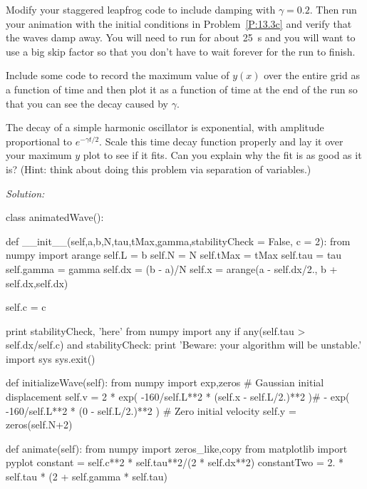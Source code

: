 \begin{enumerate}
\begin{enumerate}
\fi
    \subprob \label{P:14.1b} Modify your staggered leapfrog code to
    include damping with $\gamma=0.2$. Then run your animation with
    the initial conditions in Problem~\ref{P:13.3c} and verify that
    the waves damp away.  You will need to run for about 25~s and you
    will want to use a big skip factor so that you don't have to wait
    forever for the run to finish.  

    \subprob \label{P:14.1d}Include some code to record the maximum value of $y(x)$
    over the entire grid as a function of time and then plot it as a
    function of time at the end of the run so that you can see the
    decay caused by $\gamma$. 

    \subprob The decay of a simple harmonic oscillator is exponential,
    with amplitude proportional to $e^{-\gamma t/2}$. Scale this time
    decay function properly and lay it over your maximum $y$ plot to
    see if it fits. Can you explain why the fit is as good as it is?
    (Hint: think about doing this problem via separation of
    variables.)  


\end{enumerate}
\ifsolutions
\textit{Solution:}\\
\begin{codeexample}
\begin{VerbatimOut}{\listingFile}

class animatedWave():

    def __init__(self,a,b,N,tau,tMax,gamma,stabilityCheck = False, c = 2):
        from numpy import arange
        self.L = b
        self.N = N
        self.tMax = tMax
        self.tau = tau
        self.gamma = gamma
        self.dx = (b - a)/N
        self.x = arange(a - self.dx/2., b + self.dx,self.dx)

        self.c = c

        print stabilityCheck, 'here'
        from numpy import any
        if any(self.tau > self.dx/self.c) and stabilityCheck:
            print 'Beware: your algorithm will be unstable.'
            import sys
            sys.exit()


    def initializeWave(self):
        from numpy import exp,zeros
        # Gaussian initial displacement
        self.v = 2 * exp( -160/self.L**2 * (self.x - self.L/2.)**2 )# - exp( -160/self.L**2 * (0 - self.L/2.)**2 )
        # Zero initial velocity
        self.y = zeros(self.N+2)


    def animate(self):
        from numpy import zeros_like,copy
        from matplotlib import pyplot
        constant = self.c**2 * self.tau**2/(2 * self.dx**2)
        constantTwo = 2. * self.tau * (2 + self.gamma * self.tau) 
        

\end{VerbatimOut}
\end{codeexample}
\end{enumerate}
